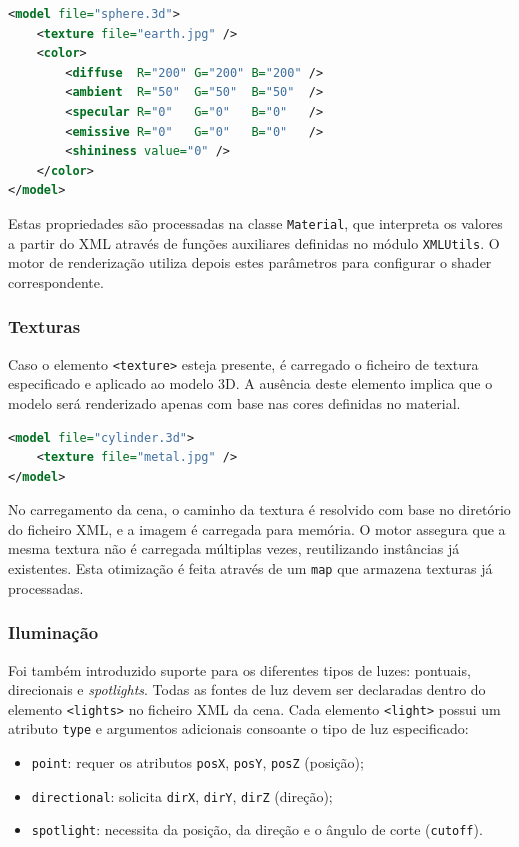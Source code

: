 \documentclass[12pt, a4paper]{article}
\begin{document}
\begin{lstlisting}[language=xml]
<model file="sphere.3d">
    <texture file="earth.jpg" />
    <color>
        <diffuse  R="200" G="200" B="200" />
        <ambient  R="50"  G="50"  B="50"  />
        <specular R="0"   G="0"   B="0"   />
        <emissive R="0"   G="0"   B="0"   />
        <shininess value="0" />
    </color>
</model>
\end{lstlisting}

Estas propriedades são processadas na classe \texttt{Material}, que interpreta os valores a partir
do XML através de funções auxiliares definidas no módulo \texttt{XMLUtils}. O motor de renderização
utiliza depois estes parâmetros para configurar o shader correspondente.

\subsubsection{Texturas}

Caso o elemento \texttt{<texture>} esteja presente, é carregado o ficheiro de textura especificado
e aplicado ao modelo 3D. A ausência deste elemento implica que o modelo será renderizado apenas com
base nas cores definidas no material.

\begin{lstlisting}[language=xml]
<model file="cylinder.3d">
    <texture file="metal.jpg" />
</model>
\end{lstlisting}

No carregamento da cena, o caminho da textura é resolvido com base no diretório do ficheiro XML, e
a imagem é carregada para memória. O motor assegura que a mesma textura não é carregada múltiplas
vezes, reutilizando instâncias já existentes. Esta otimização é feita através de um \texttt{map}
que armazena texturas já processadas.

\subsubsection{Iluminação}

Foi também introduzido suporte para os diferentes tipos de luzes: pontuais, direcionais e
\emph{spotlights}. Todas as fontes de luz devem ser declaradas dentro do elemento \texttt{<lights>}
no ficheiro XML da cena. Cada elemento \texttt{<light>} possui um atributo \texttt{type} e
argumentos adicionais consoante o tipo de luz especificado:

\begin{itemize}
    \item \texttt{point}: requer os atributos \texttt{posX}, \texttt{posY}, \texttt{posZ} (posição);
    \item \texttt{directional}: solicita \texttt{dirX}, \texttt{dirY}, \texttt{dirZ} (direção);
    \item \texttt{spotlight}: necessita da posição, da direção e o ângulo de corte
    (\texttt{cutoff}).
\end{itemize}
\end{document}
